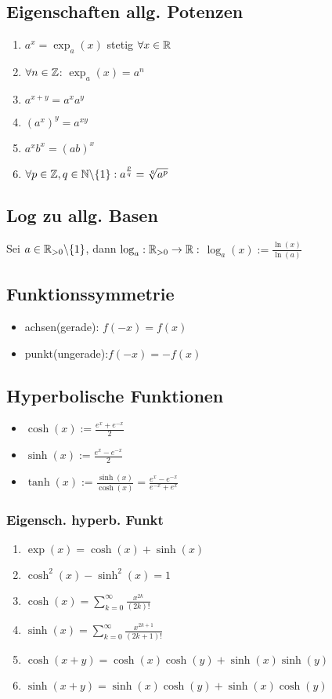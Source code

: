 \subsection*{Eigenschaften allg. Potenzen}
\begin{enumerate}[label=\alph*., noitemsep]
    \item $a^x = \exp_a(x)$ stetig $\forall x \in \mathbb R$
    \item $\forall n \in \mathbb Z$: $\exp_a(x) = a^n$
    \item $a^{x+y} = a^x a^y$
    \item $(a^x)^y = a^{xy}$
    \item $a^x b^x = (ab)^x$
    \item $\forall p \in \mathbb Z, q \in \mathbb N\backslash\{1\}: a^{\frac{p}{q}} = \sqrt[q]{a^p}$
\end{enumerate}
\subsection*{Log zu allg. Basen}
Sei $a \in \mathbb R_{> 0}\backslash\{1\}$, dann $\log_a: \mathbb R_{> 0} \rightarrow \mathbb R:$ $\log_a(x) := \frac{\ln(x)}{\ln(a)}$
\subsection*{Funktionssymmetrie}
\begin{itemize}[noitemsep]
    \item achsen(gerade): $f(-x) = f(x)$
    \item punkt(ungerade):$f(-x) = -f(x)$
\end{itemize}
\subsection*{Hyperbolische Funktionen}
\begin{itemize}[noitemsep]
    \item $\cosh(x) := \frac{e^x + e^{-x}}{2}$
    \item $\sinh(x) := \frac{e^x - e^{-x}}{2}$
    \item $\tanh(x) := \frac{\sinh(x)}{\cosh(x)} = \frac{e^x - e^{-x}}{e^{-x}  + e^x}$
\end{itemize}
\subsubsection*{Eigensch. hyperb. Funkt}
\begin{enumerate}[label=\alph*., noitemsep]
    \item $\exp(x) = \cosh(x) + \sinh(x)$
    \item $\cosh^2(x) - \sinh^2(x) = 1$
    \item $\cosh(x) = \sum\limits_{k = 0}^{\infty} \frac{x^{2k}}{(2k)!}$
    \item $\sinh(x) = \sum\limits_{k = 0}^{\infty} \frac{x^{2k+1}}{(2k + 1)!}$
    \item $\cosh(x + y) = \cosh(x)\cosh(y) + \sinh(x) \sinh(y)$
    \item $\sinh(x + y) = \sinh(x) \cosh(y) + \sinh(x) \cosh(y)$
\end{enumerate}
